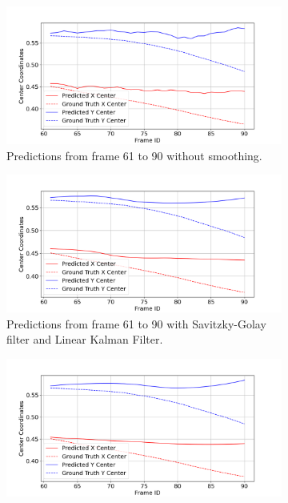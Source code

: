 \documentclass[12pt,oneside]{book} %
\begin{document}
\begin{figure}[H]
    \centering
    \begin{subfigure}[t]{0.9\textwidth}
        \includegraphics[width=\textwidth]{figures/framework/video_lab_platform_6 Raw Data - 1.png}
        \caption{Predictions from frame 61 to 90 without smoothing.}
        \label{fig:framework-video_lab_platform_6-1-raw}
    \end{subfigure}
    \hfill
    \begin{subfigure}[t]{0.9\textwidth}
        \includegraphics[width=\textwidth]{figures/framework/video_lab_platform_6 LKF SA Filter - 1.png}
        \caption{Predictions from frame 61 to 90 with Savitzky-Golay filter and Linear Kalman Filter.}
        \label{fig:framework-video_lab_platform_6-1-sa-lkf}
    \end{subfigure}
    \vfill
    \begin{subfigure}[t]{0.9\textwidth}
        \includegraphics[width=\textwidth]{figures/framework/video_lab_platform_6 SA Filter - 1.png}

\end{subfigure}
\end{figure}
\end{document}
